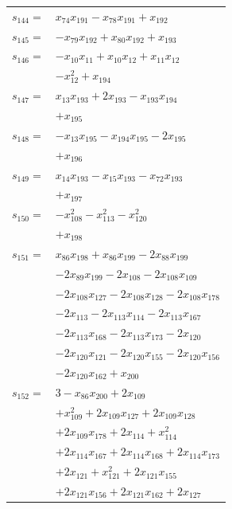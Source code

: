 \begin{longtable}{@{}r@{\;}l@{}}
\(s_{144}=\) & \(\displaystyle x_{74}x_{191} -x_{78}x_{191} +x_{192}\) \\[3pt]
\(s_{145}=\) & \(\displaystyle -x_{79}x_{192} +x_{80}x_{192} +x_{193}\) \\[3pt]
\(s_{146}=\) & \(\displaystyle -x_{10}x_{11} +x_{10}x_{12} +x_{11}x_{12}\) \\
 & \(\displaystyle -x_{12}^{2} +x_{194}\) \\[3pt]
\(s_{147}=\) & \(\displaystyle x_{13}x_{193} +2x_{193} -x_{193}x_{194}\) \\
 & \(\displaystyle +x_{195}\) \\[3pt]
\(s_{148}=\) & \(\displaystyle -x_{13}x_{195} -x_{194}x_{195} -2x_{195}\) \\
 & \(\displaystyle +x_{196}\) \\[3pt]
\(s_{149}=\) & \(\displaystyle x_{14}x_{193} -x_{15}x_{193} -x_{72}x_{193}\) \\
 & \(\displaystyle +x_{197}\) \\[3pt]
\(s_{150}=\) & \(\displaystyle -x_{108}^{2} -x_{113}^{2} -x_{120}^{2}\) \\
 & \(\displaystyle +x_{198}\) \\[3pt]
\(s_{151}=\) & \(\displaystyle x_{86}x_{198} +x_{86}x_{199} -2x_{88}x_{199}\) \\
 & \(\displaystyle -2x_{89}x_{199} -2x_{108} -2x_{108}x_{109}\) \\
 & \(\displaystyle -2x_{108}x_{127} -2x_{108}x_{128} -2x_{108}x_{178}\) \\
 & \(\displaystyle -2x_{113} -2x_{113}x_{114} -2x_{113}x_{167}\) \\
 & \(\displaystyle -2x_{113}x_{168} -2x_{113}x_{173} -2x_{120}\) \\
 & \(\displaystyle -2x_{120}x_{121} -2x_{120}x_{155} -2x_{120}x_{156}\) \\
 & \(\displaystyle -2x_{120}x_{162} +x_{200}\) \\[3pt]
\(s_{152}=\) & \(\displaystyle 3 -x_{86}x_{200} +2x_{109}\) \\
 & \(\displaystyle +x_{109}^{2} +2x_{109}x_{127} +2x_{109}x_{128}\) \\
 & \(\displaystyle +2x_{109}x_{178} +2x_{114} +x_{114}^{2}\) \\
 & \(\displaystyle +2x_{114}x_{167} +2x_{114}x_{168} +2x_{114}x_{173}\) \\
 & \(\displaystyle +2x_{121} +x_{121}^{2} +2x_{121}x_{155}\) \\
 & \(\displaystyle +2x_{121}x_{156} +2x_{121}x_{162} +2x_{127}\) \\

\end{longtable}
